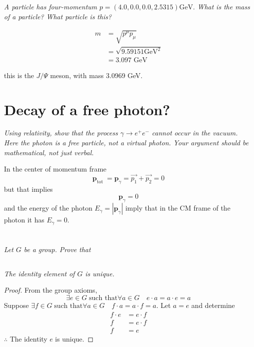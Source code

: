 \documentclass{article}
\begin{document}
\subsection{}
\textit{A particle has four-momentum $p=(4.0,0.0,0.0,2.5315) \mathrm{GeV} .$ What is the mass of a particle? What particle is this?}

\begin{align*}
    m&=\sqrt{p^{\mu} p_{\mu}}\\
    &=\sqrt{9.59151 \mathrm{GeV}^{2}}\\
    &=3.097 \text { GeV }
\end{align*}

this is the $J/\Psi$ meson, with mass 3.0969 GeV.

\newpage


\section{Decay of a free photon?}
\textit{Using relativity, show that the process $\gamma \rightarrow e^{+} e^{-}$ cannot occur in the vacuum. Here the photon is a free particle, not a virtual photon. Your argument should be mathematical, not just verbal.}

In the center of momentum frame
$$
\mathbf{p}_{\text {tot }}=\mathbf{p}_{\gamma}=\vec{p_1}+\vec{p_2}=0
$$
but that implies
$$
\mathbf{p}_{\gamma}=0
$$
and the energy of the photon $E_{\gamma} = \left|\mathbf{p}_\gamma\right|$ imply that in the CM frame of the photon it has $E_\gamma = 0$.



\newpage


\section{}
\textit{Let $G$ be a group. Prove that}

\subsection{}
\textit{The identity element of $G$ is unique.}

\begin{proof}
From the group axioms,
$$
\exists e \in G \; \text {such that} \forall a \in G \quad e \cdot a=a \cdot e=a
$$
Suppose $\exists f \in G \; \text {such that} \forall a \in G \quad f \cdot a=a \cdot f=a$. Let $a = e$ and determine 
\begin{align*}
    f \cdot e  &= e \cdot f  \\
    f  &=  e \cdot f \\
    f &=e
\end{align*}
$\therefore$ The identity $e$ is unique.
\end{proof}
\end{document}
